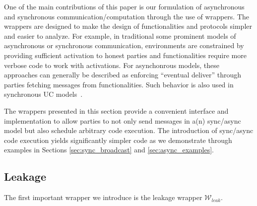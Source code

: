 One of the main contributions of this paper is our formulation of asynchronous and synchronous communication/computation through the use of wrappers.
The wrappers are designed to make the design of functionalities and protocols simpler and easier to analyze.
For example, in traditional some prominent models of asynchronous or synchronous communication, environments are constrained by providing sufficient activation to honest parties and functionalities require more verbose code to work with activations.
For asynchonrous models, these approaches can generally be described as enforcing ``eventual deliver'' through parties fetching messages from functionalities.
Such behavior is also used in synchronous UC models~\cite{katz-clock}.

The wrappers presented in this section provide a convenient interface and implementation to allow parties to not only send messages in a(n) sync/async model but also schedule arbitrary code execution.
The introduction of sync/async code execution yields significantly simpler code as we demonstrate through examples in Sections \ref{sec:sync_broadcast} and \ref{sec:async_examples}.

\subsection{Leakage}
The first important wrapper we introduce is the leakage wrapper $\mathcal{W}_{leak}$.


